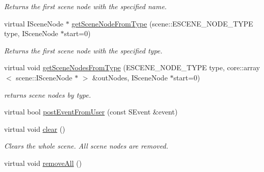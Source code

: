 \begin{DoxyCompactItemize}
\begin{DoxyCompactList}\small\item\em Returns the first scene node with the specified name. \end{DoxyCompactList}\item 
\hypertarget{classirr_1_1scene_1_1_c_scene_manager_af4e034dd5e949d3f03daa72eb24a8959}{virtual I\-Scene\-Node $\ast$ \hyperlink{classirr_1_1scene_1_1_c_scene_manager_af4e034dd5e949d3f03daa72eb24a8959}{get\-Scene\-Node\-From\-Type} (scene\-::\-E\-S\-C\-E\-N\-E\-\_\-\-N\-O\-D\-E\-\_\-\-T\-Y\-P\-E type, I\-Scene\-Node $\ast$start=0)}\label{classirr_1_1scene_1_1_c_scene_manager_af4e034dd5e949d3f03daa72eb24a8959}

\begin{DoxyCompactList}\small\item\em Returns the first scene node with the specified type. \end{DoxyCompactList}\item 
\hypertarget{classirr_1_1scene_1_1_c_scene_manager_aac107a2562f8fba7c50073a5194caef2}{virtual void \hyperlink{classirr_1_1scene_1_1_c_scene_manager_aac107a2562f8fba7c50073a5194caef2}{get\-Scene\-Nodes\-From\-Type} (E\-S\-C\-E\-N\-E\-\_\-\-N\-O\-D\-E\-\_\-\-T\-Y\-P\-E type, core\-::array$<$ scene\-::\-I\-Scene\-Node $\ast$ $>$ \&out\-Nodes, I\-Scene\-Node $\ast$start=0)}\label{classirr_1_1scene_1_1_c_scene_manager_aac107a2562f8fba7c50073a5194caef2}

\begin{DoxyCompactList}\small\item\em returns scene nodes by type. \end{DoxyCompactList}\item 
virtual bool \hyperlink{classirr_1_1scene_1_1_c_scene_manager_a1702d5a194a210f7c36e808593e43ceb}{post\-Event\-From\-User} (const S\-Event \&event)
\item 
\hypertarget{classirr_1_1scene_1_1_c_scene_manager_ae0cb1944118f2030140069a67d2897a7}{virtual void \hyperlink{classirr_1_1scene_1_1_c_scene_manager_ae0cb1944118f2030140069a67d2897a7}{clear} ()}\label{classirr_1_1scene_1_1_c_scene_manager_ae0cb1944118f2030140069a67d2897a7}

\begin{DoxyCompactList}\small\item\em Clears the whole scene. All scene nodes are removed. \end{DoxyCompactList}\item 
\hypertarget{classirr_1_1scene_1_1_c_scene_manager_a1e779510944f3cd128d4dee71714fc51}{virtual void \hyperlink{classirr_1_1scene_1_1_c_scene_manager_a1e779510944f3cd128d4dee71714fc51}{remove\-All} ()}\label{classirr_1_1scene_1_1_c_scene_manager_a1e779510944f3cd128d4dee71714fc51}


\end{DoxyCompactItemize}
